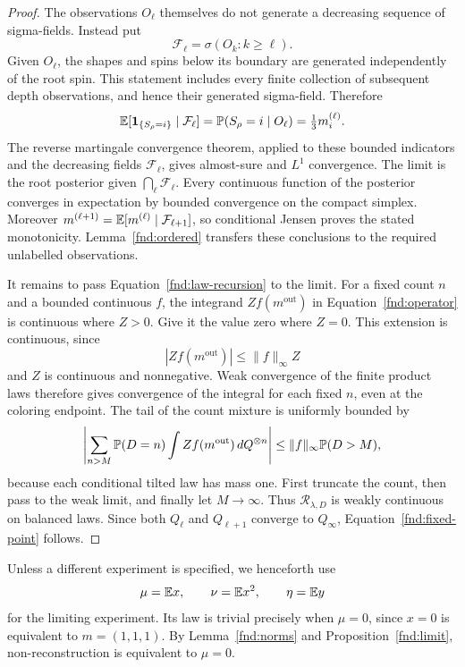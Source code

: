 \begin{proof}
The observations \(O_\ell\) themselves do not generate a decreasing
sequence of sigma-fields.  Instead put
\[
 \mathcal F_\ell=\sigma(O_k:k\geq\ell).
\]
Given \(O_\ell\), the shapes and spins below its boundary are generated
independently of the root spin.  This statement includes every finite
collection of subsequent depth observations, and hence their generated
sigma-field.  Therefore
\[
 \mathbb E[\mathbf1_{\{S_\rho=i\}}\mid\mathcal F_\ell]
 =\mathbb P(S_\rho=i\mid O_\ell)=\tfrac13m_i^{(\ell)}.
\]
The reverse martingale convergence theorem, applied to these bounded
indicators and the decreasing fields \(\mathcal F_\ell\), gives
almost-sure and \(L^1\) convergence.  The limit is the root posterior
given \(\bigcap_\ell\mathcal F_\ell\).  Every continuous function of
the posterior converges in expectation by bounded convergence on the
compact simplex.  Moreover
\(m^{(\ell+1)}=\mathbb E[m^{(\ell)}\mid\mathcal F_{\ell+1}]\), so
conditional Jensen proves the stated monotonicity.  Lemma~\ref{fnd:ordered}
transfers these conclusions to the required unlabelled observations.

It remains to pass Equation~\eqref{fnd:law-recursion} to the limit.
For a fixed count \(n\) and a bounded continuous \(f\), the integrand
\(Zf(m^{\mathrm{out}})\) in Equation~\eqref{fnd:operator} is continuous
where \(Z>0\).  Give it the value zero where \(Z=0\).  This extension
is continuous, since
\[
 |Zf(m^{\mathrm{out}})|\leq\|f\|_\infty Z
\]
and \(Z\) is continuous and nonnegative.  Weak convergence of the
finite product laws therefore gives convergence of the integral for
each fixed \(n\), even at the coloring endpoint.  The tail of the
count mixture is uniformly bounded by
\begin{equation}\label{fnd:count-tail}
 \left|\sum_{n>M}\mathbb P(D=n)
     \int Zf(m^{\mathrm{out}})\,dQ^{\otimes n}\right|
 \leq\|f\|_\infty\mathbb P(D>M),
\end{equation}
because each conditional tilted law has mass one.  First truncate the
count, then pass to the weak limit, and finally let \(M\to\infty\).
Thus \(\mathcal R_{\lambda,D}\) is weakly continuous on balanced
laws.  Since both \(Q_\ell\) and \(Q_{\ell+1}\) converge to
\(Q_\infty\), Equation~\eqref{fnd:fixed-point} follows.
\end{proof}

Unless a different experiment is specified, we henceforth use
\begin{equation}\label{fnd:limit-moments}
 \mu=\mathbb E x,\qquad \nu=\mathbb E x^2,\qquad \eta=\mathbb E y
\end{equation}
for the limiting experiment.  Its law is trivial precisely when
\(\mu=0\), since \(x=0\) is equivalent to \(m=(1,1,1)\).
By Lemma~\ref{fnd:norms} and Proposition~\ref{fnd:limit},
non-reconstruction is equivalent to \(\mu=0\).

